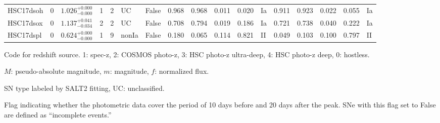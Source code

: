 \documentclass[proof]{pasj01}
\begin{document}
\begin{table}[htbp]
{\begin{tabular}{p{4.5em}p{1.2em}p{4.0em}p{2.1em}|p{0.6em}p{1.8em}p{3.0em}|p{2.9em}|p{1.2em}p{1.2em}p{1.2em}p{0.6em}|p{2.9em}|p{1.2em}p{1.2em}p{1.2em}p{0.6em}}
HSC17dsoh &     0 &    $1.026_{-0.000}^{+0.000}$ &         1 &    2 &  UC &   False &    0.968 &    0.968 &    0.011 &    0.020 &      Ia &    0.911 &    0.923 &    0.022 &    0.055 &      Ia \\
HSC17dsox &     0 &    $1.137_{-0.034}^{+0.041}$ &         2 &    2 &  UC &   False &    0.708 &    0.794 &    0.019 &    0.186 &      Ia &    0.721 &    0.738 &    0.040 &    0.222 &      Ia \\
HSC17dspl &     0 &    $0.624_{-0.000}^{+0.000}$ &         1 &    9 &  nonIa &   False &    0.180 &    0.065 &    0.114 &    0.821 &      II &    0.049 &    0.103 &    0.100 &    0.797 &      II \\
\hline
\end{tabular}
}\label{tab:h_results}
\begin{tabnote}
\footnotemark[$*$] Code for redshift source.
1: spec-z, 2: COSMOS photo-z, 3: HSC photo-z ultra-deep, 4: HSC photo-z deep, 0: hostless.

\footnotemark[$\dagger$] $M$: pseudo-absolute magnitude, $m$: magnitude, $f$: normalized flux.

\footnotemark[$\ddagger$] SN type labeled by SALT2 fitting, UC: unclassified.

\footnotemark[$\S$] Flag indicating whether the photometric data cover the period of 10 days before and 20 days after the peak. SNe with this flag set to False are defined as ``incomplete events.''
\end{tabnote}
\end{table}
%
%
\end{document}
